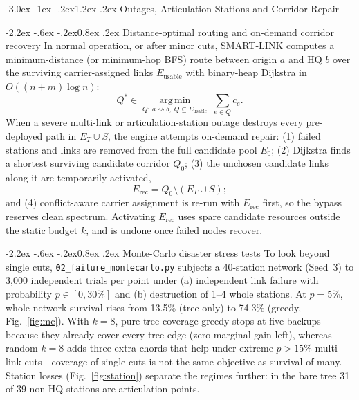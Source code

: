 \documentclass[10pt,a4paper]{article}
\makeatletter
\renewcommand\section{\@startsection{section}{1}{\z@}%
  {-3.0ex \@plus -1ex \@minus -.2ex}{1.2ex \@plus .2ex}%
  {\normalfont\large\bfseries}}
\renewcommand\subsection{\@startsection{subsection}{2}{\z@}%
  {-2.2ex \@plus -.6ex \@minus -.2ex}{0.8ex \@plus .2ex}%
  {\normalfont\normalsize\bfseries}}
\makeatother
\begin{document}
\section{Outages, Articulation Stations and Corridor Repair}\label{sec:outage}

\subsection{Distance-optimal routing and on-demand corridor recovery}
In normal operation, or after minor cuts, SMART-LINK computes a minimum-distance (or minimum-hop BFS) route between origin
$a$ and HQ $b$ over the surviving carrier-assigned links $E_\text{usable}$ with binary-heap Dijkstra in $O((n+m)\log n)$:
\begin{equation}\label{eq:route}
  Q^\ast\in\operatorname*{arg\,min}_{Q:\,a\rightsquigarrow b,\;Q\subseteq E_\text{usable}}\;\sum_{e\in Q}c_e .
\end{equation}
When a severe multi-link or articulation-station outage destroys every pre-deployed path in $E_T\cup S$, the engine attempts
on-demand repair: (1) failed stations and links are removed from the full candidate pool $E_0$; (2) Dijkstra finds a
shortest surviving candidate corridor $Q_0$; (3) the unchosen candidate links along it are temporarily activated,
\begin{equation}\label{eq:repair}
  E_\text{rec}=Q_0\setminus(E_T\cup S);
\end{equation}
and (4) conflict-aware carrier assignment is re-run with $E_\text{rec}$ first, so the bypass reserves clean spectrum.
Activating $E_\text{rec}$ uses spare candidate resources outside the static budget $k$, and is undone once failed nodes recover.

\subsection{Monte-Carlo disaster stress tests}
To look beyond single cuts, \texttt{02\_failure\_montecarlo.py} subjects a 40-station network (Seed~3) to 3{,}000 independent
trials per point under (a) independent link failure with probability $p\in[0,30\%]$ and (b) destruction of 1--4 whole stations.
At $p=5\%$, whole-network survival rises from 13.5\% (tree only) to 74.3\% (greedy, Fig.~\ref{fig:mc}). With $k=8$, pure
tree-coverage greedy stops at five backups because they already cover every tree edge (zero marginal gain left), whereas
random $k=8$ adds three extra chords that help under extreme $p>15\%$ multi-link cuts---coverage of single cuts is not the same
objective as survival of many. Station losses (Fig.~\ref{fig:station}) separate the regimes further: in the bare tree 31 of 39
non-HQ stations are articulation points.
\end{document}
